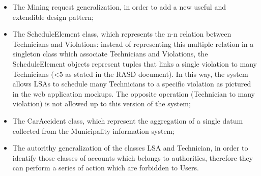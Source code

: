 \begin{itemize}
    \item The Mining request generalization, in order to add a new useful and extendible design pattern;
    \item The ScheduleElement class, which represents the n-n relation between Technicians and Violations: instead of representing this multiple relation in a singleton class which associate Technicians and Violations, the ScheduleElement objects represent tuples that links a single violation to many Technicians (<5 as stated in the RASD document). In this way, the system allows LSAs to schedule many Technicians to a specific violation as pictured in the web application mockups. The opposite operation (Technician to many violation) is not allowed up to this version of the system;
    \item The CarAccident class, which represent the aggregation of a single datum collected from the Municipality information system;
    \item The autorithy generalization of the classes LSA and Technician, in order to identify those classes of accounts which belongs to authorities, therefore they can perform a series of action which are forbidden to Users. 
\end{itemize}
